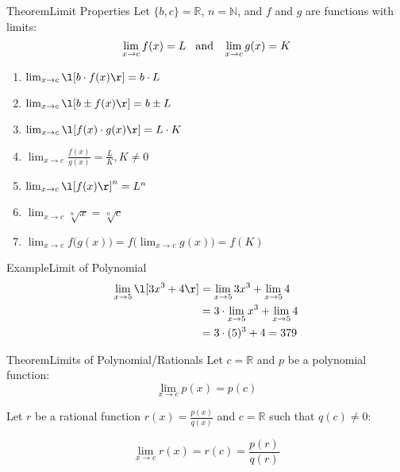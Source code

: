 \documentclass{MathNotes}
\newenvironment{example}[1]
{\begin{BlueBox}{Example}{#1}}{\end{BlueBox}}
\newenvironment{theorem}[1]
{\begin{GrayBox}{Theorem}{#1}}{\end{GrayBox}}
\begin{document}
\begin{theorem}{Limit Properties}
    Let $\{b, c\}=\mathbb{R}$, $n=\mathbb{N}$, and $f$ and $g$ are functions
    with limits:
    \begin{displaymath}
        \lim_{x\to c}f(x)=L\hspace{2ex}\text{and}\hspace{2ex}\lim_{x\to c}g(x)=K
    \end{displaymath}

    \begin{enumerate}
        \item $\lim_{x\to c}\l[ b\cdot f(x) \r]=b\cdot L$
        \item $\lim_{x\to c}\l[ b\pm f(x) \r]=b\pm L$
        \item $\lim_{x\to c}\l[ f(x)\cdot g(x) \r]=L\cdot K$
        \item $\lim_{x\to c}\frac{f(x)}{g(x)}=\frac{L}{K}, K\neq 0$
        \item $\lim_{x\to c}\l[ f(x)\r] ^n=L^n$
        \item $\lim_{x\to c}\sqrt[n]x=\sqrt[n]{c}$
        \item $\lim_{x\to c}f\bigl(g(x)\bigr)=f\bigl(\lim_{x\to c}g(x)\bigr)=f(K)$
    \end{enumerate}
\end{theorem}

\begin{example}{Limit of Polynomial}
    \begin{align*}
        \lim_{x\to 5}\l[ 3x^3+4 \r] &= \lim_{x\to 5} 3x^3 + \lim_{x\to 5}4\\
        &= 3 \cdot \lim_{x\to 5}x^3 + \lim_{x\to 5}4\\
        &= 3 \cdot (5)^3 + 4=379
    \end{align*}
\end{example}

\begin{theorem}{Limits of Polynomial/Rationals}
    Let $c=\mathbb{R}$ and $p$ be a polynomial function:
    \begin{displaymath}
        \lim_{x\to c}p(x)=p(c)
    \end{displaymath}

    Let $r$ be a rational function $r(x)=\frac{p(x)}{q(x)}$ and $c=\mathbb{R}$
    such that $q(c)\neq 0$:

    \begin{displaymath}
        \lim_{x\to c}r(x)=r(c)=\frac{p(r)}{q(r)}
    \end{displaymath}
\end{theorem}
\end{document}
